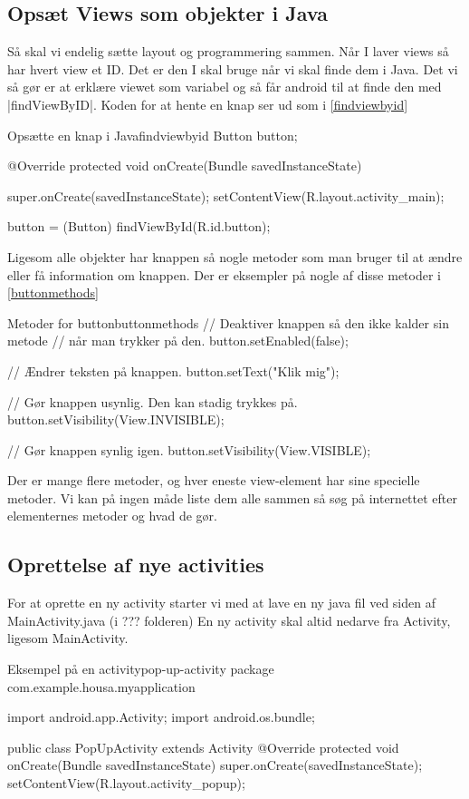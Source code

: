 \subsection{Opsæt Views som objekter i Java}
Så skal vi endelig sætte layout og programmering sammen. Når I laver views så har hvert view et ID. Det er den I skal bruge når vi skal finde dem i Java. Det vi så gør er at erklære viewet som variabel og så får android til at finde den med \JavaInline|findViewByID|. Koden for at hente en knap ser ud som i \autoref{findviewbyid}

\begin{JavaCode}{Opsætte en knap i Java}{findviewbyid}
	Button button;
	
	@Override
	protected void onCreate(Bundle savedInstanceState) {
		super.onCreate(savedInstanceState);
		setContentView(R.layout.activity_main);
		
		button = (Button) findViewById(R.id.button);
	}
\end{JavaCode}

Ligesom alle objekter har knappen så nogle metoder som man bruger til at ændre eller få information om knappen. Der er eksempler på nogle af disse metoder i \autoref{buttonmethods}
\begin{JavaCode}{Metoder for button}{buttonmethods}
	// Deaktiver knappen så den ikke kalder sin metode 
	// når man trykker på den.
	button.setEnabled(false);

	// Ændrer teksten på knappen.
	button.setText("Klik mig");
	
    // Gør knappen usynlig. Den kan stadig trykkes på.	
    button.setVisibility(View.INVISIBLE);
    
    // Gør knappen synlig igen.
    button.setVisibility(View.VISIBLE);
\end{JavaCode}
Der er mange flere metoder, og hver eneste view-element har sine specielle metoder. Vi kan på ingen måde liste dem alle sammen så søg på internettet efter elementernes metoder og hvad de gør. 


\subsection{Oprettelse af nye activities}

For at oprette en ny activity starter vi med at lave en ny java fil ved siden af MainActivity.java (i ??? folderen) En ny activity skal altid nedarve fra Activity, ligesom MainActivity. 

\begin{JavaCode}{Eksempel på en activity}{pop-up-activity}
	package com.example.housa.myapplication
	
	import android.app.Activity;
	import android.os.bundle;
	
	public class PopUpActivity extends Activity {
		@Override
		protected void onCreate(Bundle savedInstanceState) {
			super.onCreate(savedInstanceState);
			setContentView(R.layout.activity_popup);
		}
	}
\end{JavaCode}

